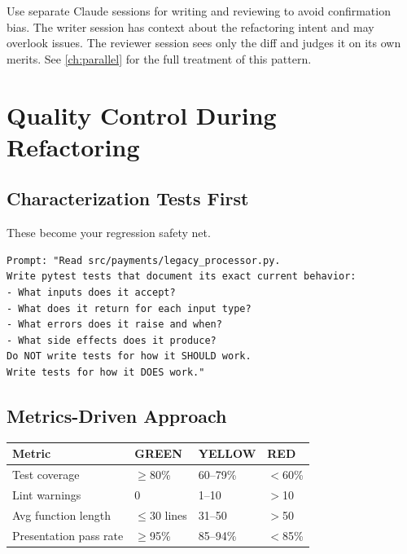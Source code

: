 Use separate Claude sessions for writing and reviewing
to avoid confirmation bias.
The writer session has context about the refactoring intent and may
overlook issues. The reviewer session sees only the diff and judges
it on its own merits.
See \cref{ch:parallel} for the full treatment of this pattern.

\section{Quality Control During Refactoring}
\label{sec:refactoring-quality}

\subsection{Characterization Tests First}

 These become your regression safety net.

\begin{verbatim}
Prompt: "Read src/payments/legacy_processor.py.
Write pytest tests that document its exact current behavior:
- What inputs does it accept?
- What does it return for each input type?
- What errors does it raise and when?
- What side effects does it produce?
Do NOT write tests for how it SHOULD work.
Write tests for how it DOES work."
\end{verbatim}


\subsection{Metrics-Driven Approach}


\begin{fullwidth}
\begin{tabular}{@{}llll@{}}
\toprule
\textbf{Metric} & \textbf{GREEN} & \textbf{YELLOW} & \textbf{RED} \\
\midrule
Test coverage & $\geq$80\% & 60--79\% & $<$60\% \\
Lint warnings & 0 & 1--10 & $>$10 \\
Avg function length & $\leq$30 lines & 31--50 & $>$50 \\
Presentation pass rate & $\geq$95\% & 85--94\% & $<$85\% \\
\bottomrule
\end{tabular}
\end{fullwidth}

